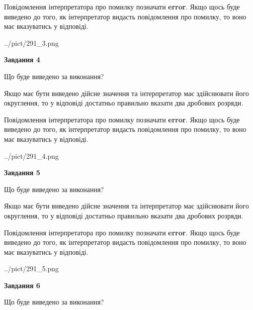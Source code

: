 \documentclass[12pt, ukrainian]{article}
\begin{document}
{\begin {Large}
Повідомлення інтерпретатора про помилку позначати \textbf{error}.
Якщо щось буде виведено до того, як інтерпретатор видасть повідомлення про помилку, 
то воно має вказуватись у відповіді. \par

\begin{center}
	{../pict/291_3.png}
\end{center}
\newpage

{\begin {center}\textbf{Завдання 4}\end {center}}\par
Що буде виведено за виконання? \par

Якщо має бути виведено дійсне значення та інтерпретатор має здійснювати його округлення, 
то у відповіді достатньо правильно вказати два дробових розряди.

Повідомлення інтерпретатора про помилку позначати \textbf{error}.
Якщо щось буде виведено до того, як інтерпретатор видасть повідомлення про помилку, 
то воно має вказуватись у відповіді. \par

\begin{center}
	{../pict/291_4.png}
\end{center}
\newpage

{\begin {center}\textbf{Завдання 5}\end {center}}\par
Що буде виведено за виконання? \par

Якщо має бути виведено дійсне значення та інтерпретатор має здійснювати його округлення, 
то у відповіді достатньо правильно вказати два дробових розряди.

Повідомлення інтерпретатора про помилку позначати \textbf{error}.
Якщо щось буде виведено до того, як інтерпретатор видасть повідомлення про помилку, 
то воно має вказуватись у відповіді. \par

\begin{center}
	{../pict/291_5.png}
\end{center}
\newpage

{\begin {center}\textbf{Завдання 6}\end {center}}\par
Що буде виведено за виконання? \par


\end{Large}}
\end{document}
